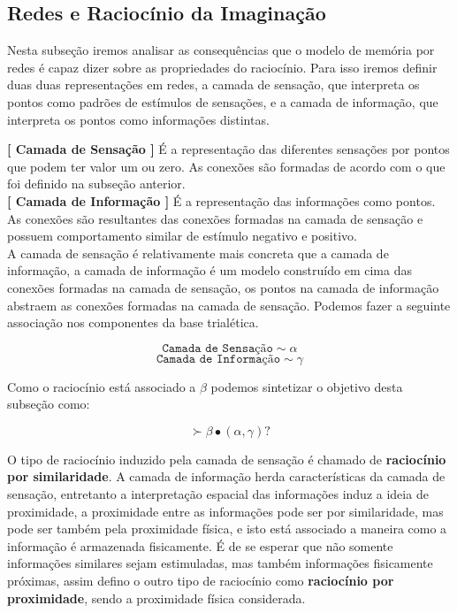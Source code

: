 \documentclass[10pt,a4paper]{report}
\begin{document}

\subsection{Redes e Raciocínio da Imaginação}

\hspace{\baselineskip}

Nesta subseção iremos analisar as consequências que o modelo de memória por redes é capaz dizer sobre as propriedades do raciocínio. Para isso iremos definir duas duas representações em redes, a camada de sensação, que interpreta os pontos como padrões de estímulos de sensações, e a camada de informação, que interpreta os pontos como informações distintas.

\hspace{\baselineskip}

\textbf{[ Camada de Sensação ]} É a representação das diferentes sensações por pontos que podem ter valor um ou zero. As conexões são formadas de acordo com o que foi definido na subseção anterior.  \\

\textbf{[ Camada de Informação ]} É a representação das informações como pontos. As conexões são resultantes das conexões formadas na camada de sensação e possuem comportamento similar de estímulo negativo e positivo. \\

A camada de sensação é relativamente mais concreta que a camada de informação, a camada de informação é um modelo construído em cima das conexões formadas na camada de sensação, os pontos na camada de informação abstraem as conexões formadas na camada de sensação. Podemos fazer a seguinte associação nos componentes da base trialética.

$$ \texttt{Camada de Sensação} \sim \alpha $$
$$ \texttt{Camada de Informação} \sim \gamma $$

Como o raciocínio está associado a $\beta$ podemos sintetizar o objetivo desta subseção como:

$$ \succ \beta \bullet (\alpha, \gamma) \text{?} $$

O tipo de raciocínio induzido pela camada de sensação é chamado de \textbf{raciocínio por similaridade}. A camada de informação herda características da camada de sensação, entretanto a interpretação espacial das informações induz a ideia de proximidade, a proximidade entre as informações pode ser por similaridade, mas pode ser também pela proximidade física, e isto está associado a maneira como a informação é armazenada fisicamente. É de se esperar que não somente informações similares sejam estimuladas, mas também informações fisicamente próximas, assim defino o outro tipo de raciocínio como \textbf{raciocínio por proximidade}, sendo a proximidade física considerada.\\
\end{document}
